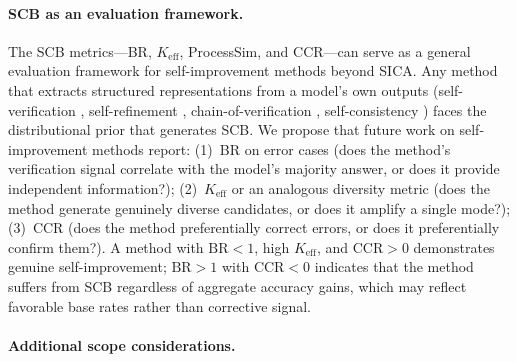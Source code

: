 \paragraph{SCB as an evaluation framework.}
\label{app:scb-evaluation}
The SCB metrics---BR, $K_\text{eff}$, ProcessSim, and CCR---can serve as a general evaluation framework for self-improvement methods beyond SICA. Any method that extracts structured representations from a model's own outputs (self-verification \citep{huang2024selfcorrect}, self-refinement \citep{madaan2023selfrefine}, chain-of-verification \citep{dhuliawala2023chainofverification}, self-consistency \citep{wang2023sc}) faces the distributional prior that generates SCB. We propose that future work on self-improvement methods report: (1)~BR on error cases (does the method's verification signal correlate with the model's majority answer, or does it provide independent information?); (2)~$K_\text{eff}$ or an analogous diversity metric (does the method generate genuinely diverse candidates, or does it amplify a single mode?); (3)~CCR (does the method preferentially correct errors, or does it preferentially confirm them?). A method with $\text{BR} < 1$, high $K_\text{eff}$, and $\text{CCR} > 0$ demonstrates genuine self-improvement; $\text{BR} > 1$ with $\text{CCR} < 0$ indicates that the method suffers from SCB regardless of aggregate accuracy gains, which may reflect favorable base rates rather than corrective signal.

\paragraph{Additional scope considerations.}


